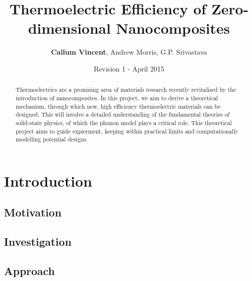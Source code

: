 \documentclass[12pt,titlepage,draft]{article}
\begin{document}
\title{Thermoelectric Efficiency of Zero-dimensional Nanocomposites}
\author{\textbf{Callum Vincent}, Andrew Morris, G.P. Srivastava}
\date{Revision 1 - April 2015}
\maketitle

\tableofcontents

\begin{abstract}

Thermoelectrics are a promising area of materials research recently revitalised by the introduction of nanocomposites. In this project, we aim to derive a theoretical mechanism, through which new, high efficiency thermoelectric materials can be designed. This will involve a detailed understanding of the fundamental theories of solid-state physics, of which the phonon model plays a critical role. This theoretical project aims to guide expierment, keeping within practical limits and computationally modelling potential designs.
\end{abstract}


\section{Introduction}
% 
\subsection{Motivation}




\subsection{Investigation}

\subsection{Approach}
\end{document}
